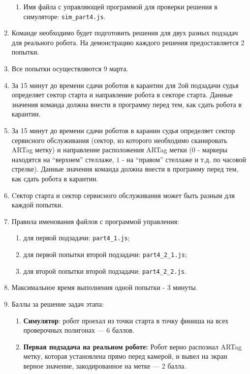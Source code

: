 \begin{enumerate}
\begin{enumerate}
        \item Имя файла с управляющей программой для проверки решения в симуляторе: \texttt{sim\_part4.js}.
    \end{enumerate}
    \item Команде необходимо будет подготовить решения для двух разных подзадач для реального робота. На демонстрацию каждого решения предоставляется 2 попытки.
    \item Все попытки осуществляются 9 марта.
    \item За 15 минут до времени сдачи роботов в карантин для 2ой подзадачи судья определяет сектор старта и направление робота в секторе старта.
            Данные значения команда должна внести в программу перед тем, как сдать робота в карантин.
    \item За 15 минут до времени сдачи роботов в каранин судья определяет сектор сервисного обслуживания
        (сектор, из которого необходимо сканировать ARTag метку) и направление расположения ARTag метки ($0$ -
        маркеры находятся на ``верхнем'' стеллаже, $1$ - на ``правом'' стеллаже и т.д. по часовой стрелке).
        Данные значения команда должна внести в программу перед тем, как сдать робота в карантин.
    \item Cектор старта и сектор сервисного обслуживания может быть разным для каждой попытки.
    \item Правила именования файлов с программой управления:
    \begin{enumerate}
        \item для первой подзадачи: \texttt{part4\_1.js};
        \item для первой попытки второй подзадачи: \texttt{part4\_2\_1.js};
        \item для второй попытки второй подзадачи: \texttt{part4\_2\_2.js}.
    \end{enumerate}
    \item Максимальное время выполнения одной попытки - 3 минуты.
    \item Баллы за решение задач этапа:
    \begin{enumerate}
        \item \textbf{Симулятор}: робот проехал из точки старта в точку финиша на всех проверочных полигонах --- 6 баллов.
        \item \textbf{Первая подзадача на реальном роботе:} Робот верно распознал ARTag метку, которая установлена прямо
                перед камерой, и вывел на экран верное значение, закодированное на метке --- 2 балла.

\end{enumerate}
\end{enumerate}
